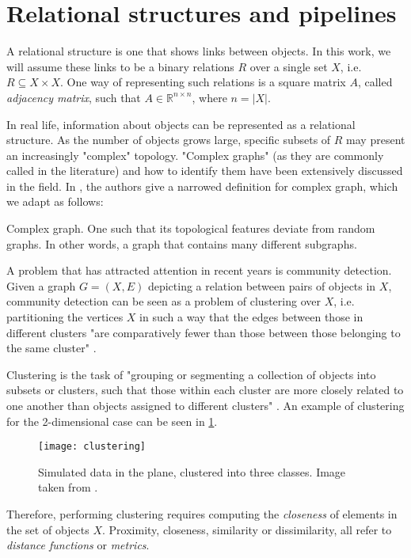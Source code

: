\documentclass[../main.tex]{subfiles}
\begin{document}
\section{Relational structures and pipelines}\label{general_pipeline}
A relational structure is one that shows links between objects. In this work, we will assume these links to be a binary relations $R$ over a single set $X$, i.e. $R \subseteq X \times X$. One way of representing such relations is a square matrix $A$, called \emph{adjacency matrix}, such that $A \in \mathbb{R}^{n \times n}$, where $n =\left\vert{X}\right\vert$.
\par In real life, information about objects can be represented as a relational structure. As the number of objects grows large, specific subsets of $R$ may present an increasingly "complex" topology. "Complex graphs" (as they are commonly called in the literature) and how to identify them have been extensively discussed in the field. In \cite{Kim2008}, the authors give a narrowed definition for complex graph, which we adapt as follows:
\theoremstyle{definition}
\begin{definition}{Complex graph}. One such that its topological features deviate from random graphs. In other words, a graph that contains many different subgraphs.
\end{definition}
\par A problem that has attracted attention in recent years is community detection. Given a graph $G = (X, E)$ depicting a relation between pairs of objects in $X$, community detection can be seen as a problem of clustering over $X$, i.e. partitioning the vertices $X$ in such a way that the edges between those in different clusters "are comparatively fewer than those between those belonging to the same cluster" \cite{Fortunato2010}. 
\par Clustering is the task of "grouping or segmenting a collection of objects into subsets or clusters, such that those within each cluster are more closely related to one another than objects assigned to different clusters" \cite{hastie2008}. An example of clustering for the 2-dimensional case can be seen in \ref{clustering}.
\begin{figure}[ht]
\centering
\texttt{[image: clustering]}
\caption{Simulated data in the plane, clustered into three classes. Image taken from \cite{hastie2008}.}
\label{clustering}
\end{figure}
\par Therefore, performing clustering requires computing the \emph{closeness} of elements in the set of objects $X$. Proximity, closeness, similarity or dissimilarity, all refer to \emph{distance functions} or \emph{metrics}. 
\end{document}
